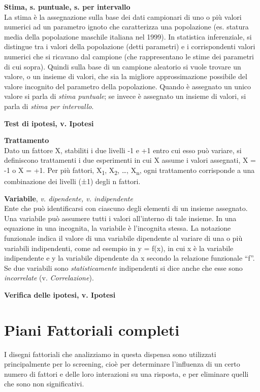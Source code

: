\documentclass[
  11pt,
]{book}
\begin{document}
\textbf{Stima, s. puntuale, s. per intervallo}\\
La stima è la assegnazione sulla base dei dati campionari di uno o più valori numerici ad un parametro ignoto che caratterizza una popolazione (es. statura media della popolazione maschile italiana nel 1999).
In statistica inferenziale, si distingue tra i valori della popolazione (detti parametri) e i corrispondenti valori numerici che si ricavano dal campione (che rappresentano le stime dei parametri di cui sopra).
Quindi sulla base di un campione aleatorio si vuole trovare un valore, o un insieme di valori, che sia la migliore approssimazione possibile del valore incognito del parametro della popolazione.
Quando è assegnato un unico valore si parla di \emph{stima puntuale}; se invece è assegnato un insieme di valori, si parla di \emph{stima per intervallo}.

\textbf{Test di ipotesi, v. Ipotesi}

\textbf{Trattamento}\\
Dato un fattore X, stabiliti i due livelli -1 e +1 entro cui esso può variare, si definiscono trattamenti i due esperimenti in cui X assume i valori assegnati, X = -1 o X = +1.
Per più fattori, X\textsubscript{1}, X\textsubscript{2}, \ldots, X\textsubscript{n}, ogni trattamento corrisponde a una combinazione dei livelli (±1) degli n fattori.

\textbf{Variabile}, \emph{v. dipendente, v. indipendente}\\
Ente che può identificarsi con ciascuno degli elementi di un insieme assegnato.
Una variabile può assumere tutti i valori all'interno di tale insieme.
In una equazione in una incognita, la variabile è l'incognita stessa.
La notazione funzionale indica il valore di una variabile dipendente al variare di una o più variabili indipendenti, come ad esempio in y = f(x), in cui x è la variabile indipendente e y la variabile dipendente da x secondo la relazione funzionale ``f''.
Se due variabili sono \emph{statisticamente} indipendenti si dice anche che esse sono \emph{incorrelate} (v. \emph{Correlazione}).

\textbf{Verifica delle ipotesi, v. Ipotesi}

\hypertarget{piani-fattoriali-completi}{%
\chapter{Piani Fattoriali completi}\label{piani-fattoriali-completi}}

I disegni fattoriali che analizziamo in questa dispensa sono utilizzati
principalmente per lo screening, cioè per determinare l'influenza di un
certo numero di fattori e delle loro interazioni su una risposta, e per
eliminare quelli che sono non significativi.
\end{document}
